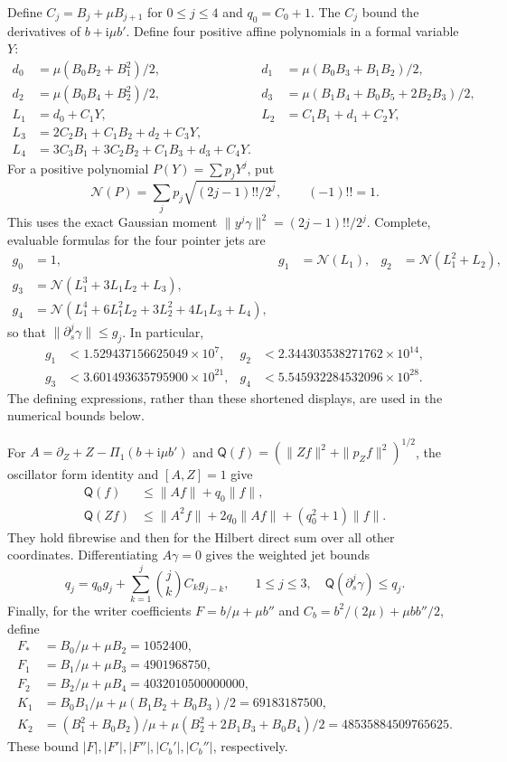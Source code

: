 \documentclass[11pt]{article}
\theoremstyle{definition}\newtheorem{definition}[theorem]{Definition}
\theoremstyle{remark}\newtheorem{remark}[theorem]{Remark}
\begin{document}
Define $C_j=B_j+\mu B_{j+1}$ for $0\le j\le4$ and $q_0=C_0+1$.
The $C_j$ bound the derivatives of $b+\mathrm i\mu b'$.
Define four positive affine polynomials in a formal variable $Y$:
\begin{align*}
 d_0&=\mu(B_0B_2+B_1^2)/2,&
 d_1&=\mu(B_0B_3+B_1B_2)/2,\\
 d_2&=\mu(B_0B_4+B_2^2)/2,&
 d_3&=\mu(B_1B_4+B_0B_5+2B_2B_3)/2,\\
 L_1&=d_0+C_1Y,&L_2&=C_1B_1+d_1+C_2Y,\\
 L_3&=2C_2B_1+C_1B_2+d_2+C_3Y,&&\\[-2mm]
 L_4&=3C_3B_1+3C_2B_2+C_1B_3+d_3+C_4Y.&&
\end{align*}
For a positive polynomial $P(Y)=\sum p_jY^j$, put
\[
 \mathcal N(P)=\sum_jp_j\sqrt{(2j-1)!!/2^j},\qquad(-1)!!=1.
\]
This uses the exact Gaussian moment $\|y^j\gamma\|^2=(2j-1)!!/2^j$.
Complete, evaluable formulas for the four pointer jets are
\begin{align}
 g_0&=1,&g_1&=\mathcal N(L_1),&
 g_2&=\mathcal N(L_1^2+L_2),\nonumber\\
 g_3&=\mathcal N(L_1^3+3L_1L_2+L_3),&&&\nonumber\\[-1mm]
 g_4&=\mathcal N(L_1^4+6L_1^2L_2+3L_2^2+4L_1L_3+L_4),
 &&&\label{prefix:jets}
\end{align}
so that $\|\partial_s^j\gamma\|\le g_j$.  In particular,
\[
 \begin{aligned}
 g_1&<1.529437156625049\times10^7,&
 g_2&<2.344303538271762\times10^{14},\\
 g_3&<3.601493635795900\times10^{21},&
 g_4&<5.545932284532096\times10^{28}.
 \end{aligned}
\]
The defining expressions, rather than these shortened displays, are
used in the numerical bounds below.

For $A=\partial_Z+Z-\Pi_1(b+\mathrm i\mu b')$ and
$\mathsf Q(f)=(\|Zf\|^2+\|p_Zf\|^2)^{1/2}$, the oscillator form identity
and $[A,Z]=1$ give
\begin{align}
 \mathsf Q(f)&\le\|Af\|+q_0\|f\|,\nonumber\\
 \mathsf Q(Zf)&\le\|A^2f\|+2q_0\|Af\|+(q_0^2+1)\|f\|.
 \label{prefix:oscform}
\end{align}
They hold fibrewise and then for the Hilbert direct sum over all other
coordinates.  Differentiating $A\gamma=0$ gives the weighted jet bounds
\[
 q_j=q_0g_j+\sum_{k=1}^j\binom jk C_kg_{j-k},\qquad 1\le j\le3,
 \quad \mathsf Q(\partial_s^j\gamma)\le q_j.
\]
Finally, for the writer coefficients $F=b/\mu+\mu b''$ and
$C_b=b^2/(2\mu)+\mu bb''/2$, define
\begin{align}
 F_*&=B_0/\mu+\mu B_2=1052400,\nonumber\\
 F_1&=B_1/\mu+\mu B_3=4901968750,\nonumber\\
 F_2&=B_2/\mu+\mu B_4=4032010500000000,\nonumber\\
 K_1&=B_0B_1/\mu+\mu(B_1B_2+B_0B_3)/2=69183187500,\nonumber\\
 K_2&=(B_1^2+B_0B_2)/\mu
       +\mu(B_2^2+2B_1B_3+B_0B_4)/2
       =48535884509765625.
 \label{prefix:forces}
\end{align}
These bound $|F|,|F'|,|F''|,|C_b'|,|C_b''|$, respectively.
\end{document}
